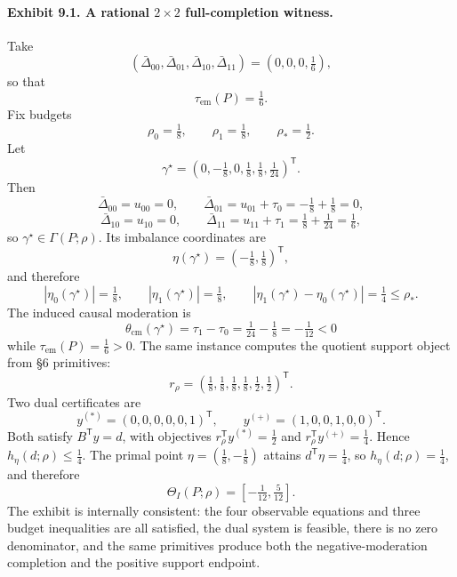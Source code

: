 \documentclass[11pt]{article}
\newcommand{\transpose}{\mathsf{T}}
\theoremstyle{definition}
\theoremstyle{plain}
\theoremstyle{remark}
\begin{document}
\paragraph{Exhibit 9.1. A rational \(2\times 2\) full-completion witness.}
Take
\[
(\bar\Delta_{00},\bar\Delta_{01},\bar\Delta_{10},\bar\Delta_{11})=\left(0,0,0,\tfrac16\right),
\]
so that
\[
\tau_{\mathrm{em}}(P)=\tfrac16.
\]
Fix budgets
\[
\rho_0=\tfrac18,\qquad \rho_1=\tfrac18,\qquad \rho_\ast=\tfrac12.
\]
Let
\[
\gamma^\star=
\left(
0,-\tfrac18,0,\tfrac18,\tfrac18,\tfrac1{24}
\right)^\transpose.
\]
Then
\[
\bar\Delta_{00}=u_{00}=0,\qquad
\bar\Delta_{01}=u_{01}+\tau_0=-\tfrac18+\tfrac18=0,
\]
\[
\bar\Delta_{10}=u_{10}=0,\qquad
\bar\Delta_{11}=u_{11}+\tau_1=\tfrac18+\tfrac1{24}=\tfrac16,
\]
so \(\gamma^\star\in\Gamma(P;\rho)\). Its imbalance coordinates are
\[
\eta(\gamma^\star)=
\left(-\tfrac18,\tfrac18\right)^\transpose,
\]
and therefore
\[
|\eta_0(\gamma^\star)|=\tfrac18,\qquad
|\eta_1(\gamma^\star)|=\tfrac18,\qquad
|\eta_1(\gamma^\star)-\eta_0(\gamma^\star)|=\tfrac14\le \rho_\ast.
\]
The induced causal moderation is
\[
\theta_{\mathrm{cm}}(\gamma^\star)
=
\tau_1-\tau_0
=
\tfrac1{24}-\tfrac18
=
-\tfrac1{12}<0
\]
while \(\tau_{\mathrm{em}}(P)=\tfrac16>0\). The same instance computes the quotient support object from \S6 primitives:
\[
r_\rho=
\left(\tfrac18,\tfrac18,\tfrac18,\tfrac18,\tfrac12,\tfrac12\right)^\transpose.
\]
Two dual certificates are
\[
y^{(\ast)}=(0,0,0,0,0,1)^\transpose,\qquad
y^{(+)}=(1,0,0,1,0,0)^\transpose.
\]
Both satisfy \(B^\transpose y=d\), with objectives \(r_\rho^\transpose y^{(\ast)}=\tfrac12\) and \(r_\rho^\transpose y^{(+)}=\tfrac14\). Hence \(h_\eta(d;\rho)\le \tfrac14\). The primal point \(\eta=(\tfrac18,-\tfrac18)\) attains \(d^\transpose\eta=\tfrac14\), so \(h_\eta(d;\rho)=\tfrac14\), and therefore
\[
\Theta_I(P;\rho)=\left[-\tfrac1{12},\tfrac5{12}\right].
\]
The exhibit is internally consistent: the four observable equations and three budget inequalities are all satisfied, the dual system is feasible, there is no zero denominator, and the same primitives produce both the negative-moderation completion and the positive support endpoint.
\end{document}

